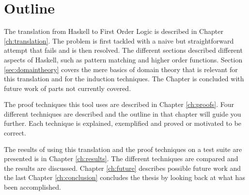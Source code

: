 
\section{Outline}

The translation from Haskell to First Order Logic is described in
Chapter \ref{ch:translation}. The problem is first tackled with a
naive but straightforward attempt that fails and is then resolved. The
different sections described different aspects of Haskell, such as
pattern matching and higher order functions.  Section
\ref{sec:domaintheory} covers the mere basics of domain theory that is
relevant for this translation and for the induction techniques.  The
Chapter is concluded with future work of parts not currently covered.

The proof techniques this tool uses are described in Chapter
\ref{ch:proofs}. Four different techniques are described and the
outline in that chapter will guide you further. Each technique is
explained, exemplified and proved or motivated to be correct.

The results of using this translation and the proof techniques on a
test suite are presented is in Chapter \ref{ch:results}. The different
techniques are compared and the results are discussed.  Chapter
\ref{ch:future} describes possible future work and the last Chapter
\ref{ch:conclusion} concludes the thesis by looking back at what has
been accomplished.
